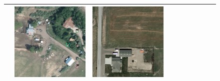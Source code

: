 \begin{figure}[h!]
\begin{tabularx}{\textwidth}{c|*{9}{X}}
    & \includegraphics[trim={740pt 420pt 180pt 510pt},clip,width=\linewidth]{images/015Results/01abb_vs_obb/comp_images/abb/523.png}
    & \includegraphics[trim={300pt 355pt 610pt 570pt},clip,width=\linewidth]{images/015Results/01abb_vs_obb/comp_images/abb/198.png} \\ \hline

\end{tabularx}
\end{figure}
